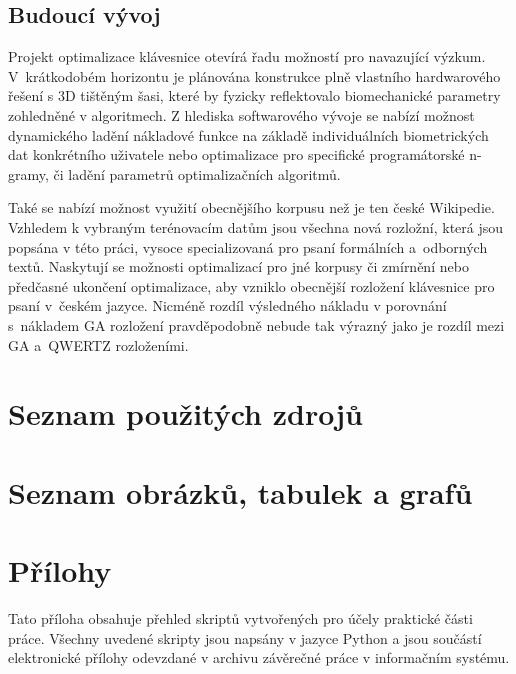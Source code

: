 \documentclass[a4paper, twoside, 12pt, czech]{article}
\begin{document}
\subsection{Budoucí vývoj}
Projekt optimalizace klávesnice otevírá řadu možností pro navazující výzkum. 
V~krátkodobém horizontu je plánována konstrukce plně vlastního hardwarového 
řešení s 3D tištěným šasi, které by fyzicky reflektovalo biomechanické parametry 
zohledněné v algoritmech. Z hlediska softwarového vývoje se nabízí možnost 
dynamického ladění nákladové funkce na základě individuálních biometrických dat 
konkrétního uživatele nebo optimalizace pro specifické programátorské n-gramy, 
či ladění parametrů 
optimalizačních algoritmů.

Také se nabízí možnost využití obecnějšího korpusu než je ten české Wikipedie.
Vzhledem k vybraným terénovacím datům jsou všechna nová rozložní, která jsou popsána
v této práci, vysoce specializovaná pro psaní formálních a~odborných textů. Naskytují 
se možnosti optimalizací pro jné korpusy či zmírnění nebo předčasné ukončení 
optimalizace, aby vzniklo 
obecnější rozložení klávesnice pro psaní v~českém jazyce. Nicméně rozdíl výsledného 
nákladu v porovnání s~ná\-kladem GA rozložení pravděpodobně nebude tak výrazný jako 
je rozdíl mezi GA a~QWERTZ rozloženími.

\newpage
\section{Seznam použitých zdrojů}
\begingroup
\sloppy
\printbibliography[heading=none]
\endgroup
\newpage
\section{Seznam obrázků, tabulek a grafů}
\listoffigures
\listoftables
\listofgraphs
\section*{Přílohy}
Tato příloha obsahuje přehled skriptů vytvořených pro účely praktické části práce. Všechny uvedené skripty jsou napsány v jazyce Python a jsou součástí elektronické přílohy odevzdané v archivu závěrečné práce v informačním systému.
\end{document}
